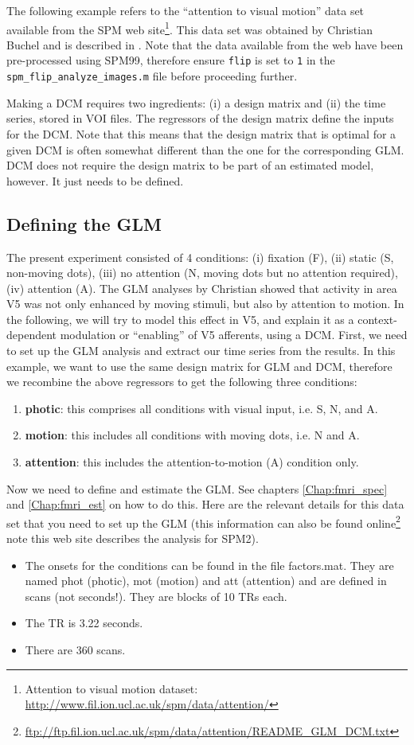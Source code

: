 The following example refers to the ``attention to visual motion'' data set available from the SPM web site\footnote{Attention to visual motion dataset: \url{http://www.fil.ion.ucl.ac.uk/spm/data/attention/}}. This data set was obtained by Christian Buchel and is described in \cite{buchel97}.  Note that the data available from the web have been pre-processed using SPM99, therefore ensure \texttt{flip} is set to \texttt{1} in the \texttt{spm\_flip\_analyze\_images.m} file before proceeding further.

Making a DCM requires two ingredients: (i) a design matrix and (ii) the time series, stored in VOI files.  The regressors of the design matrix define the inputs for the DCM.  Note that this means that the design matrix that is optimal for a given DCM is often somewhat different than the one for the corresponding GLM. DCM does not require the design matrix to be part of an estimated model, however. It just needs to be defined.

\subsection{Defining the GLM}
The present experiment consisted of 4 conditions: (i) fixation (F), (ii) static (S, non-moving dots), (iii) no attention (N, moving dots but no attention required), (iv) attention (A). The GLM analyses by Christian showed that activity in area V5 was not only enhanced by moving stimuli, but also by attention to motion.  In the following, we will try to model this effect in V5, and explain it as a context-dependent modulation or ``enabling'' of V5 afferents, using a DCM. First, we need to set up the GLM analysis and extract our time series from the results. In this example, we want to use the same design matrix for GLM and DCM, therefore we recombine the above regressors to get the following three conditions:
\begin{enumerate}
\item{{\bf photic}: this comprises all conditions with visual input, i.e. S, N, and A.}
\item{{\bf motion}: this includes all conditions with moving dots, i.e. N and A.}
\item{{\bf attention}: this includes the attention-to-motion (A) condition only.}
\end{enumerate}
Now we need to define and estimate the GLM. See chapters \ref{Chap:fmri_spec} and \ref{Chap:fmri_est} on how to do this. Here are the relevant details for this data set that you need to set up the GLM (this information can also be found online\footnote{\url{ftp://ftp.fil.ion.ucl.ac.uk/spm/data/attention/README_GLM_DCM.txt}}
note this web site describes the analysis for SPM2).
\begin{itemize}
\item{The onsets for the conditions can be found in the file factors.mat.  They are named phot (photic), mot (motion) and att (attention) and are defined in scans (not seconds!).  They are blocks of 10 TRs each.}
\item{The TR is 3.22 seconds.}
\item{There are 360 scans.}
\end{itemize}


